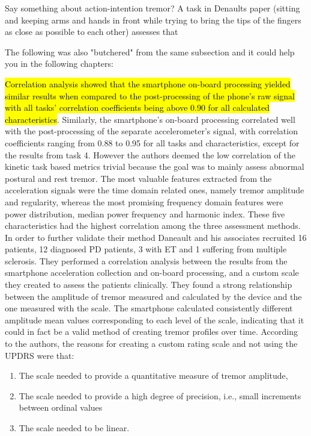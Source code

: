 Say something about action-intention tremor? A task in Denaults paper (sitting and keeping arms and hands in front while trying to bring the tips of the fingers as close as possible to each other) assesses that

The following was also "butchered" from the same subsection and it could help you in the following chapters:

\hl{Correlation analysis showed that the smartphone on-board processing yielded similar results when compared to the post-processing of the phone's raw signal with all tasks' correlation coefficients being above 0.90 for all calculated characteristics}. Similarly, the smartphone's on-board processing correlated well with the post-processing of the separate accelerometer's signal, with correlation coefficients ranging from 0.88 to 0.95 for all tasks and characteristics, except for the results from task 4. However the authors deemed the low correlation of the kinetic task based metrics trivial because the goal was to mainly assess abnormal postural and rest tremor. The most valuable features extracted from the acceleration signals were the time domain related ones, namely tremor amplitude and regularity, whereas the most promising frequency domain features were power distribution, median power frequency and harmonic index. These five characteristics had the highest correlation among the three assessment methods. In order to further validate their method Daneault and his associates recruited 16 patients, 12 diagnosed PD patients, 3 with ET and 1 suffering from multiple sclerosis. They performed a correlation analysis between the results from the smartphone acceleration collection and on-board processing, and a custom scale they created to assess the patients clinically. They found a strong relationship between the amplitude of tremor measured and calculated by the device and the one measured with the scale. The smartphone calculated consistently different amplitude mean values corresponding to each level of the scale, indicating that it could in fact be a valid method of creating tremor profiles over time. 
According to the authors, the reasons for creating a custom rating scale and not using the UPDRS were that:\par
\begin{enumerate}
\item The scale needed to provide a quantitative measure of tremor amplitude, 
\item The scale needed to provide a high degree of precision, i.e., small increments between ordinal values
\item The scale needed to be linear.
\end{enumerate}





